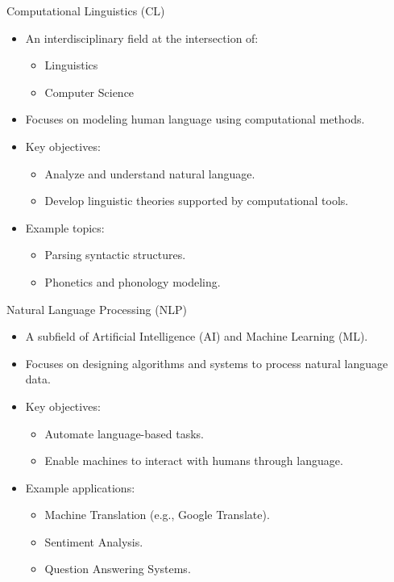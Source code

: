 \documentclass{beamer}
\begin{document}
\begin{frame}{Computational Linguistics (CL)}
    \begin{itemize}
        \item An interdisciplinary field at the intersection of:
        \begin{itemize}
            \item Linguistics
            \item Computer Science
        \end{itemize}
        \item Focuses on modeling human language using computational methods.
        \item Key objectives:
        \begin{itemize}
            \item Analyze and understand natural language.
            \item Develop linguistic theories supported by computational tools.
        \end{itemize}
        \item Example topics:
        \begin{itemize}
            \item Parsing syntactic structures.
            \item Phonetics and phonology modeling.
        \end{itemize}
    \end{itemize}
\end{frame}

\begin{frame}{Natural Language Processing (NLP)}
    \begin{itemize}
        \item A subfield of Artificial Intelligence (AI) and Machine Learning (ML).
        \item Focuses on designing algorithms and systems to process natural language data.
        \item Key objectives:
        \begin{itemize}
            \item Automate language-based tasks.
            \item Enable machines to interact with humans through language.
        \end{itemize}
        \item Example applications:
        \begin{itemize}
            \item Machine Translation (e.g., Google Translate).
            \item Sentiment Analysis.
            \item Question Answering Systems.
        \end{itemize}
    \end{itemize}
\end{frame}
\end{document}
